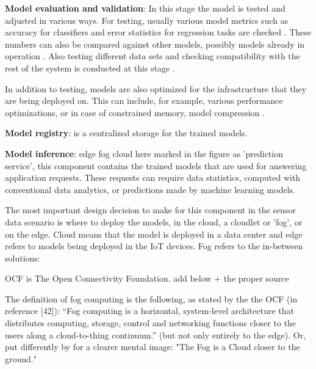 \textbf{Model evaluation and validation}: In this stage the model is tested and adjusted in various ways. For testing, usually various model metrics such as accuracy for classifiers and error statistics for regression tasks are checked \cite{iotsurvey}. These numbers can also be compared against other models, possibly models already in operation \cite{googlemlops}. Also testing different data sets and checking compatibility with the rest of the system is conducted at this stage \cite{googlemlops}.

In addition to testing, models are also optimized for the infrastructure that they are being deployed on. This can include, for example, various performance optimizations, or in case of constrained memory, model compression \cite{iotsurvey}.

\textbf{Model registry}: is a centralized storage for the trained models. 


\textbf{Model inference}: edge fog cloud here marked in the figure as 'prediction service', this component contains the trained models that are used for answering application requests. These requests can require data statistics, computed with conventional data analytics, or predictions made by machine learning models.

The most important design decision to make for this component in the sensor data scenario is where to deploy the models, in the cloud, a cloudlet or 'fog', or on the edge. Cloud means that the model is deployed in a data center and edge refers to models being deployed in the IoT devices. Fog refers to the in-between solutions: 

OCF is The Open Connectivity Foundation. add below + the proper source

The definition of fog computing is the following, as stated by the the OCF (in \cite{fogsurvey} reference [42]): “Fog computing is a horizontal, system-level architecture that distributes computing, storage, control and networking functions closer to the users along a cloud-to-thing continuum.” (but not only entirely to the edge). Or, put differently by \cite{fogsurvey} for a clearer mental image: "The Fog is a Cloud closer to the ground."



